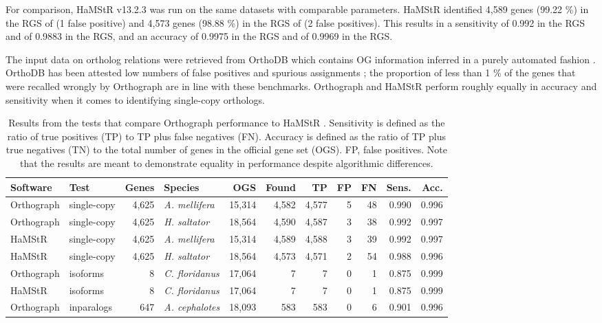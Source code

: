 For comparison, HaMStR v13.2.3 was run on the same datasets with
comparable parameters. HaMStR identified 4,589 genes (99.22 \%) in the
RGS of  (1 false positive) and 4,573 genes (98.88
\%) in the RGS of  (2 false positives). This
results in a sensitivity of 0.992 in the  RGS and
of 0.9883 in the  RGS, and an accuracy of 0.9975 in
the  RGS and of 0.9969 in the  RGS.

The input data on ortholog relations were retrieved from OrthoDB which
contains OG information inferred in a purely automated fashion
\cite{Waterhouse2011a}. OrthoDB has been attested low numbers of false
positives and spurious assignments \cite{Trachana2011}; the proportion
of less than 1 \% of the genes that were recalled wrongly by Orthograph
are in line with these benchmarks. Orthograph and HaMStR perform roughly
equally in accuracy and sensitivity when it comes to identifying
single-copy orthologs.


\begin{sidewaystable}[h!]
\caption[Orthograph performance compared to
HaMStR \citep{Ebersberger2009}]{Results from the tests that compare
Orthograph performance to HaMStR \citep{Ebersberger2009}.  Sensitivity
is defined as the ratio of true positives (TP) to TP plus false
negatives (FN). Accuracy is defined as the ratio of TP plus true
negatives (TN) to the total number of genes in the official gene set
(OGS). FP, false positives. Note that the results are meant to
demonstrate equality in performance despite algorithmic
differences.}\label{tab:orthograph-tests}
\begin{tabular}{@{}llrlrrrrrrr@{}}
\toprule
Software   & Test        & Genes  & Species                & OGS       & Found  & TP    & FP & FN & Sens.       & Acc.  \\
\midrule
Orthograph & single-copy & 4,625  & \textit{A. mellifera}  & 15,314    & 4,582  & 4,577 & 5  & 48 & 0.990       & 0.996 \\
Orthograph & single-copy & 4,625  & \textit{H. saltator}   & 18,564    & 4,590  & 4,587 & 3  & 38 & 0.992       & 0.997 \\
HaMStR     & single-copy & 4,625  & \textit{A. mellifera}  & 15,314    & 4,589  & 4,588 & 3  & 39 & 0.992       & 0.997 \\
HaMStR     & single-copy & 4,625  & \textit{H. saltator}   & 18,564    & 4,573  & 4,571 & 2  & 54 & 0.988       & 0.996 \\
Orthograph & isoforms    & 8      & \textit{C. floridanus} & 17,064    & 7      & 7     & 0  & 1  & 0.875       & 0.999 \\
HaMStR     & isoforms    & 8      & \textit{C. floridanus} & 17,064    & 7      & 7     & 0  & 1  & 0.875       & 0.999 \\
Orthograph & inparalogs  & 647    & \textit{A. cephalotes} & 18,093    & 583    & 583   & 0  & 6  & 0.901       & 0.996 \\
\bottomrule
\end{tabular}
\end{sidewaystable}

